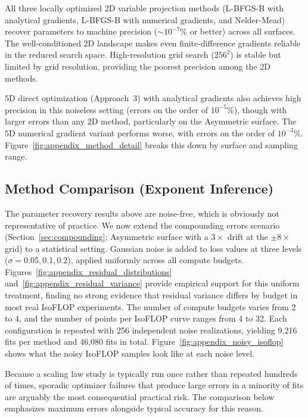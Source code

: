 \documentclass[11pt]{article}
\begin{document}
All three locally optimized 2D variable projection methods (L-BFGS-B with
analytical gradients, L-BFGS-B with numerical gradients, and Nelder-Mead)
recover parameters to machine precision ($\sim 10^{-7}$\% or better) across
all surfaces. The well-conditioned 2D landscape makes even finite-difference
gradients reliable in the reduced search space. High-resolution grid search
($256^2$) is stable but limited by grid resolution, providing the poorest
precision among the 2D methods.

5D direct optimization (Approach~3) with analytical gradients also achieves
high precision in this noiseless setting (errors on the order of
$10^{-5}$\%), though with larger errors than any 2D method, particularly on the Asymmetric surface. The 5D numerical gradient variant performs worse, with
errors on the order of $10^{-3}$\%.
Figure~\ref{fig:appendix_method_detail} breaks this down by
surface and sampling range.


\subsection{Method Comparison (Exponent Inference)}
\label{sec:method_comparison_exponent_inference}

The parameter recovery results above are noise-free, which is obviously not
representative of practice. We now extend the compounding errors scenario
(Section~\ref{sec:compounding}; Asymmetric surface with a $3\times$ drift at
the $\pm 8\times$ grid) to a statistical setting. Gaussian noise is added to
loss values at three levels ($\sigma = 0.05, 0.1, 0.2$), applied uniformly
across all compute budgets.
Figures~\ref{fig:appendix_residual_distributions}
and~\ref{fig:appendix_residual_variance} provide empirical support for this
uniform treatment, finding no strong evidence that residual variance differs
by budget in most real IsoFLOP experiments. The number of compute
budgets varies from 2 to 4, and the number of points per IsoFLOP curve ranges
from 4 to 32. Each configuration is repeated with 256 independent noise
realizations, yielding 9{,}216 fits per method and 46{,}080 fits in total.
Figure~\ref{fig:appendix_noisy_isoflop} shows what the noisy
IsoFLOP samples look like at each noise level.

Because a scaling law study is typically run once rather than repeated hundreds
of times, sporadic optimizer failures that produce large errors in a minority
of fits are arguably the most consequential practical risk. The comparison
below emphasizes maximum errors alongside typical accuracy for this reason.
\end{document}

